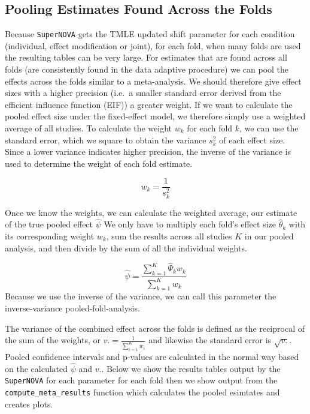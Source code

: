 \documentclass[
]{article}
\begin{document}
\hypertarget{pooling-estimates-found-across-the-folds}{%
\subsection{Pooling Estimates Found Across the
Folds}\label{pooling-estimates-found-across-the-folds}}

Because \texttt{SuperNOVA} gets the TMLE updated shift parameter for
each condition (individual, effect modification or joint), for each
fold, when many folds are used the resulting tables can be very large.
For estimates that are found across all folds (are consistently found in
the data adaptive procedure) we can pool the effects across the folds
similar to a meta-analysis. We should therefore give effect sizes with a
higher precision (i.e.~a smaller standard error derived from the
efficient influence function (EIF)) a greater weight. If we want to
calculate the pooled effect size under the fixed-effect model, we
therefore simply use a weighted average of all studies. To calculate the
weight \(w_k\) for each fold \(k\), we can use the standard error, which
we square to obtain the variance \(s^2_k\) of each effect size. Since a
lower variance indicates higher precision, the inverse of the variance
is used to determine the weight of each fold estimate.

\[w_k = \frac{1}{s^2_k}\]

Once we know the weights, we can calculate the weighted average, our
estimate of the true pooled effect \(\hat{\psi}\) We only have to
multiply each fold's effect size \(\hat{\theta}_k\) with its
corresponding weight \(w_k\), sum the results across all studies \(K\)
in our pooled analysis, and then divide by the sum of all the individual
weights.

\[\hat{\psi} = \frac{\sum_{k = 1}^K \hat{\Psi}_k w_k}{\sum_{k = 1}^K w_k}\]
Because we use the inverse of the variance, we can call this parameter
the inverse-variance pooled-fold-analysis.

The variance of the combined effect across the folds is defined as the
reciprocal of the sum of the weights, or
\(v. = \frac{1}{\sum_{i=1}^K w_i}\) and likewise the standard error is
\(\sqrt{v.}\). Pooled confidence intervals and p-values are calculated
in the normal way based on the calculated \(\hat{\psi}\) and \(v.\).
Below we show the results tables output by the \texttt{SuperNOVA} for
each parameter for each fold then we show output from the
\texttt{compute\_meta\_results} function which calculates the pooled
esimtates and creates plots.
\end{document}
